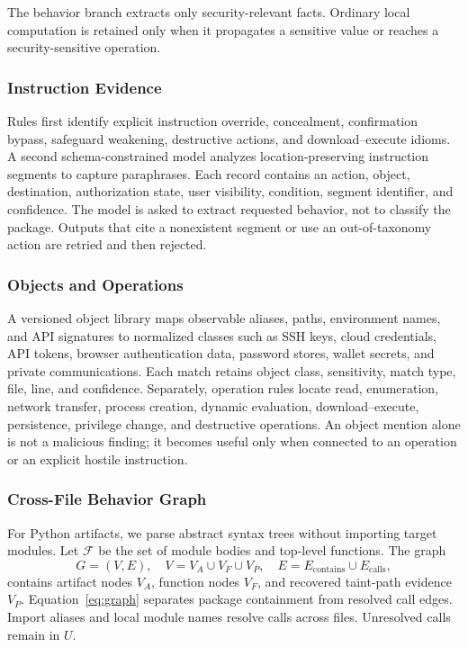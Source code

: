 The behavior branch extracts only security-relevant facts. Ordinary local
computation is retained only when it propagates a sensitive value or reaches a
security-sensitive operation.

\subsubsection{Instruction Evidence}

Rules first identify explicit instruction override, concealment, confirmation
bypass, safeguard weakening, destructive actions, and download--execute
idioms. A second schema-constrained model analyzes location-preserving
instruction segments to capture paraphrases. Each record contains an action,
object, destination, authorization state, user visibility, condition, segment
identifier, and confidence. The model is asked to extract requested behavior,
not to classify the package. Outputs that cite a nonexistent segment or use an
out-of-taxonomy action are retried and then rejected.

\subsubsection{Objects and Operations}

A versioned object library maps observable aliases, paths, environment names,
and API signatures to normalized classes such as SSH keys, cloud credentials,
API tokens, browser authentication data, password stores, wallet secrets, and
private communications. Each match retains object class, sensitivity, match
type, file, line, and confidence. Separately, operation rules locate read,
enumeration, network transfer, process creation, dynamic evaluation,
download--execute, persistence, privilege change, and destructive operations.
An object mention alone is not a malicious finding; it becomes useful only
when connected to an operation or an explicit hostile instruction.

\subsubsection{Cross-File Behavior Graph}

For Python artifacts, we parse abstract syntax trees without importing target
modules. Let $\mathcal{F}$ be the set of module bodies and top-level functions.
The graph
\begin{equation}
G=(V,E),\quad V=V_A\cup V_F\cup V_P,\quad
E=E_{\mathrm{contains}}\cup E_{\mathrm{calls}},
\label{eq:graph}
\end{equation}
contains artifact nodes $V_A$, function nodes $V_F$, and recovered taint-path
evidence $V_P$. Equation~\ref{eq:graph} separates package containment from
resolved call edges. Import aliases and local module names resolve calls across
files. Unresolved calls remain in $U$.


